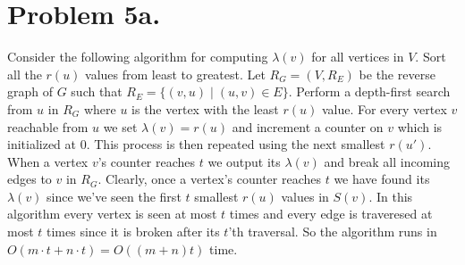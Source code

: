 \documentclass[12pt]{article}
\begin{document}
\pagestyle{plain}
\titleformat{\subsection}[runin]
  {\normalfont\large\bfseries}{\thesubsection}{1em}{}
\titleformat{\subsubsection}[runin]
  {\normalfont\large\bfseries}{\thesubsubsection}{1em}{}

\section*{Problem 5a.}
Consider the following algorithm for computing $\lambda(v)$ for all vertices in
$V$. Sort all the $r(u)$ values from least to greatest. Let $R_G = (V, R_E)$ be
the reverse graph of $G$ such that $R_E = \{(v,u) \mid (u,v) \in E \}$. Perform
a depth-first search from $u$ in $R_G$ where $u$ is the vertex with the least
$r(u)$ value. For every vertex $v$ reachable from $u$ we set $\lambda(v) = r(u)$
and increment a counter on $v$ which is initialized at $0$. This process is then
repeated using the next smallest $r(u')$. When a vertex $v$'s counter reaches
$t$ we output its $\lambda(v)$ and break all incoming edges to $v$ in $R_G$.
Clearly, once a vertex's counter reaches $t$ we have found its $\lambda(v)$
since we've seen the first $t$ smallest $r(u)$ values in $S(v)$. In this
algorithm every vertex is seen at most $t$ times and every edge is traveresed at
most $t$ times since it is broken after its $t$'th traversal. So the algorithm
runs in $O(m\cdot t + n\cdot t) = O((m +n)t)$ time.
\end{document}
